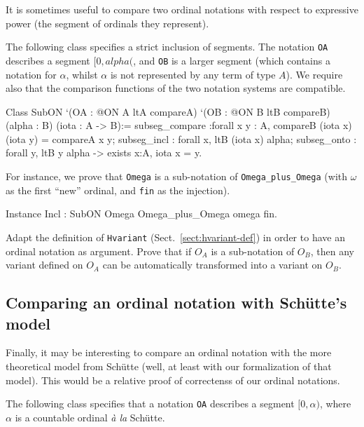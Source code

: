 It is sometimes useful to compare two ordinal notations with respect to expressive power
(the segment of ordinals  they represent). 

The following class specifies a strict inclusion of segments. The notation \texttt{OA} describes a segment $[0,alpha($, and \texttt{OB} is a larger segment (which contains a notation for $\alpha$, whilst $\alpha$ is not represented by any term of type $A$). We require also  that the comparison functions of the two notation systems are compatible.

\label{types:SubON}

\begin{Coqsrc}
Class  SubON 
       `(OA : @ON A ltA  compareA)
       `(OB : @ON B ltB  compareB)
       (alpha :  B)
       (iota : A -> B):=
  {
  subseg_compare :forall x y : A,  compareB (iota x) (iota y) =
                                 compareA x y;
  subseg_incl : forall x, ltB (iota x) alpha;
  subseg_onto : forall y, ltB y alpha  -> exists x:A, iota x = y}.
\end{Coqsrc}

For instance, we prove that \texttt{Omega} is a sub-notation of
\texttt{Omega\_plus\_Omega} (with $\omega$ as the first ``new'' ordinal, and \texttt{fin} as the injection).

\begin{Coqsrc}
Instance Incl : SubON Omega Omega_plus_Omega omega fin.
\end{Coqsrc}

\begin{project}
Adapt the definition of \texttt{Hvariant} (Sect.~\ref{sect:hvariant-def}) in order to
have an ordinal notation as argument. Prove that if $O_A$ is a sub-notation of $O_B$, then any variant defined on  $O_A$ can be automatically transformed into 
a variant on $O_B$.
\end{project}

\subsection{Comparing an ordinal notation with Schütte's model}

Finally, it may be interesting to compare an ordinal notation with the more theoretical model from Schütte (well, at least with our formalization of that model). This would be a relative proof of correctenss of our ordinal  notations.

The following class specifies that a notation \texttt{OA} describes a segment $[0,\alpha)$,
where $\alpha$ is a countable ordinal \emph{à la}  Schütte.

